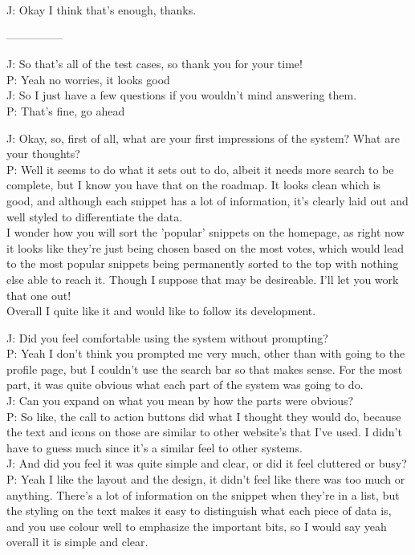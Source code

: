 J: \-\hspace{1.4cm}Okay I think that's enough, thanks. 

---------------

J: \-\hspace{1.4cm}So that's all of the test cases, so thank you for your time! \\
P: Yeah no worries, it looks good \\
J: \-\hspace{1.4cm}So I just have a few questions if you wouldn't mind answering them. \\
P: That's fine, go ahead 

J: \-\hspace{1.4cm}Okay, so, first of all, what are your first impressions of the system? What are your thoughts? \\
P: Well it seems to do what it sets out to do, albeit it needs more search to be complete, but I know you have that on the roadmap. It looks clean which is good, and although each snippet has a lot of information, it's clearly laid out and well styled to differentiate the data. \\
I wonder how you will sort the 'popular' snippets on the homepage, as right now it looks like they're just being chosen based on the most votes, which would lead to the most popular snippets being permanently sorted to the top with nothing else able to reach it. Though I suppose that may be desireable. I'll let you work that one out! \\
Overall I quite like it and would like to follow its development.

J: \-\hspace{1.4cm}Did you feel comfortable using the system without prompting? \\
P: Yeah I don't think you prompted me very much, other than with going to the profile page, but I couldn't use the search bar so that makes sense. For the most part, it was quite obvious what each part of the system was going to do.  \\
J: \-\hspace{1.4cm}Can you expand on what you mean by how the parts were obvious? \\
P: So like, the call to action buttons did what I thought they would do, because the text and icons on those are similar to other website's that I've used. I didn't have to guess much since it's a similar feel to other systems.  \\
J: \-\hspace{1.4cm}And did you feel it was quite simple and clear, or did it feel cluttered or busy? \\
P: Yeah I like the layout and the design, it didn't feel like there was too much or anything. There's a lot of information on the snippet when they're in a list, but the styling on the text makes it easy to distinguish what each piece of data is, and you use colour well to emphasize the important bits, so I would say yeah overall it is simple and clear. 


